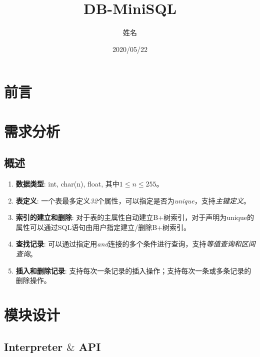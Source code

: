 \documentclass[UTF8]{ctexart}
\title{\huge{DB-MiniSQL}}
\author{姓名}
\date{2020/05/22}
\begin{document}
\maketitle

\tableofcontents

\clearpage
\section{前言}



\clearpage
\section{需求分析}
\subsection{概述}
\begin{enumerate}
    \item \textbf{数据类型}: int, char(n), float, 其中$1\le n\le255$。
    \item \textbf{表定义}: 一个表最多定义\textit{32}个属性，可以指定是否为\textit{unique}，支持\textit{主键定义}。
    \item \textbf{索引的建立和删除}: 对于表的主属性自动建立B+树索引，对于声明为unique的属性可以通过SQL语句由用户指定建立/删除B+树索引。
    \item \textbf{查找记录}: 可以通过指定用\textit{and}连接的多个条件进行查询，支持\textit{等值查询和区间查询}。
    \item \textbf{插入和删除记录}: 支持每次一条记录的插入操作；支持每次一条或多条记录的删除操作。
\end{enumerate}




\clearpage
\section{模块设计}
\subsection{Interpreter $\&$ API}
\end{document}
